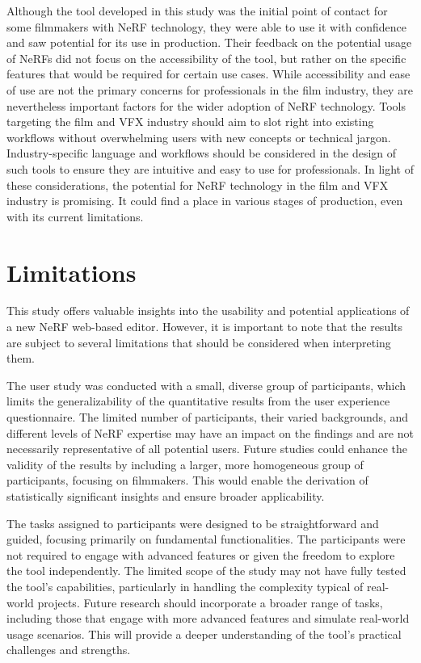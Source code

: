 Although the tool developed in this study was the initial point of contact for some filmmakers with NeRF technology, they were able to use it with confidence and saw potential for its use in production.
Their feedback on the potential usage of NeRFs did not focus on the accessibility of the tool, but rather on the specific features that would be required for certain use cases.
While accessibility and ease of use are not the primary concerns for professionals in the film industry, they are nevertheless important factors for the wider adoption of NeRF technology.
Tools targeting the film and VFX industry should aim to slot right into existing workflows without overwhelming users with new concepts or technical jargon.
Industry-specific language and workflows should be considered in the design of such tools to ensure they are intuitive and easy to use for professionals.
In light of these considerations, the potential for NeRF technology in the film and VFX industry is promising.
It could find a place in various stages of production, even with its current limitations.

\section{Limitations}
\label{sec:discussion:limitations}

This study offers valuable insights into the usability and potential applications of a new NeRF web-based editor. However, it is important to note that the results are subject to several limitations that should be considered when interpreting them.

The user study was conducted with a small, diverse group of participants, which limits the generalizability of the quantitative results from the user experience questionnaire.
The limited number of participants, their varied backgrounds, and different levels of NeRF expertise may have an impact on the findings and are not necessarily representative of all potential users.
Future studies could enhance the validity of the results by including a larger, more homogeneous group of participants, focusing on filmmakers. This would enable the derivation of statistically significant insights and ensure broader applicability.

The tasks assigned to participants were designed to be straightforward and guided, focusing primarily on fundamental functionalities.
The participants were not required to engage with advanced features or given the freedom to explore the tool independently.
The limited scope of the study may not have fully tested the tool's capabilities, particularly in handling the complexity typical of real-world projects.
Future research should incorporate a broader range of tasks, including those that engage with more advanced features and simulate real-world usage scenarios. This will provide a deeper understanding of the tool’s practical challenges and strengths.

